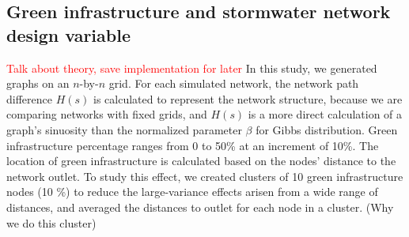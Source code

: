 \documentclass[draft]{agujournal2019}
\begin{document}
\subsection{Green infrastructure and stormwater network design variable}
\textcolor{red}{Talk about theory, save implementation for later}
In this study, we generated graphs on an $n$-by-$n$ grid. For each simulated network, the network path difference $H(s)$ is calculated to represent the network structure, because we are comparing networks with fixed grids, and $H(s)$ is a more direct calculation of a graph's sinuosity than the normalized parameter $\beta$ for Gibbs distribution. Green infrastructure percentage ranges from 0 to 50\% at an increment of 10\%. The location of green infrastructure is calculated based on the nodes' distance to the network outlet. To study this effect, we created clusters of 10 green infrastructure nodes (10 \%) to reduce the large-variance effects arisen from a wide range of distances, and averaged the distances to outlet for each node in a cluster. (Why we do this cluster)
\end{document}
